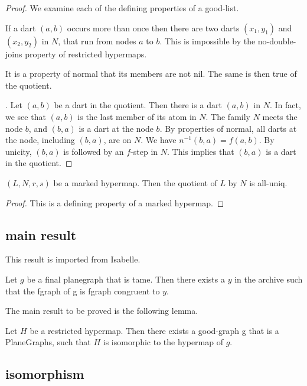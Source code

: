 \begin{proof} We examine each of the defining properties of a good-list.  

If a dart $(a,b)$ occurs more than once  then there are two darts $(x_1,y_1)$ and $(x_2,y_2)$ in $N$, that run from
nodes $a$ to $b$.  This is impossible by the no-double-joins property of restricted hypermaps.

  It is a property of normal that its members are not nil.  The same is then true of the quotient.

.  Let $(a,b)$ be a dart in the quotient.  Then there is a dart $(a,b)$ in $N$.  In fact, we see that $(a,b)$ is the last member of
its atom in $N$.  The family $N$ meets the node $b$,
and $(b,a)$ is a dart at the node $b$.  By properties of normal, all darts at the node, including $(b,a)$, are on $N$.
We have $n^{-1}(b,a) = f (a,b)$.  By unicity, $(b,a)$ is followed by an $f$-step in $N$.  This implies that $(b,a)$ is a dart in the
quotient. 
\end{proof}

\begin{lemma}  $(L,N,r,s)$ be a marked hypermap.  Then the quotient of $L$ by $N$ is all-uniq.
\end{lemma}

\begin{proof}  This is a defining property of a marked hypermap.
\end{proof}

\subsection{main result}

This result is imported from Isabelle.

\begin{theorem}  Let $g$ be a final
planegraph that is tame.  Then there exists a $y$ in the archive such
that the fgraph of g is fgraph congruent to $y$.
\end{theorem}

The main result to be proved is the following lemma.

\begin{lemma}[LSKOKJE]  Let $H$ be a restricted hypermap.  Then there exists a good-graph g that is a PlaneGraphs,
such that $H$ is isomorphic to the hypermap of $g$.
\end{lemma}

\subsection{isomorphism}


